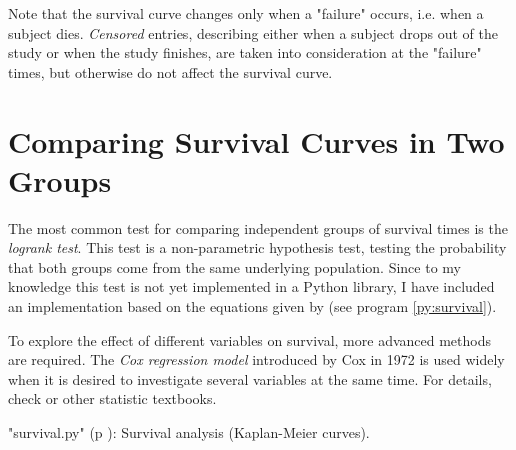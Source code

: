 Note that the survival curve changes only when a "failure" occurs, i.e. when a subject dies. \emph{Censored} entries, describing either when a subject drops out of the study or when the study finishes, are taken into consideration at the "failure" times, but otherwise do not affect the survival curve.

\section{Comparing Survival Curves in Two Groups} 

The most common test for comparing independent groups of survival times is the \emph{logrank test}. This test is a non-parametric hypothesis test, testing the probability that both groups come from the same underlying population. Since to my knowledge this test is not yet implemented in a Python library, I have included an implementation based on the equations given by \cite{altman99} (see program \ref{py:survival}).

To explore the effect of different variables on survival, more advanced methods are required. The \emph{Cox regression model} introduced by Cox in 1972 is used widely when it is desired to investigate several variables at the same time. For details, check \cite{altman99} or other statistic textbooks.

\PyImg "survival.py" (p \pageref{py:survival}): Survival analysis (Kaplan-Meier curves).
